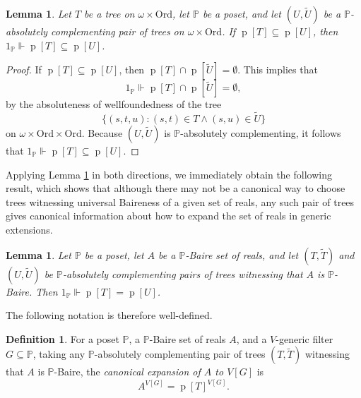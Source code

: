 \documentclass[fleqn, 11pt]{amsart}
\theoremstyle{plain}
\newtheorem{lem}[thm]{Lemma} \newtheorem*{lem*}{Lemma}
\theoremstyle{definition}
\newtheorem{defn}[thm]{Definition} \newtheorem*{defn*}{Definition}
\theoremstyle{remark}
\newcommand{\Ord}{\mathrm{Ord}}
\newcommand{\forces}{\mathbin{\Vdash}}
\DeclareMathOperator{\p}{p}
\begin{document}

\begin{lem}\label{lem-projection-inclusion}
 Let $T$ be a tree on $\omega \times \Ord$, let $\mathbb{P}$ be a poset, and let $(U, \tilde{U})$ be a $\mathbb{P}$-absolutely complementing pair of trees on $\omega \times \Ord$.
 If $\p[T] \subseteq \p[U]$, then $1_{\mathbb{P}} \forces \p[T] \subseteq \p[U]$.
\end{lem}

\begin{proof}
 If $\p[T] \subseteq \p[U]$, then $\p[T] \cap \p[\tilde{U}] = \emptyset$.
 This implies that \[1_{\mathbb{P}} \forces \p[T] \cap \p[\tilde{U}] = \emptyset,\] by the absoluteness of wellfoundedness of the tree \[\{(s,t,u) : (s,t) \in T \wedge (s,u) \in \tilde{U}\}\] on $\omega \times \Ord \times \Ord$.
 Because 
$(U, \tilde{U})$ is $\mathbb{P}$-absolutely complementing, it follows that 
$1_{\mathbb{P}} \forces \p[T] \subseteq \p[U]$.
\end{proof}

Applying Lemma \ref{lem-projection-inclusion} in both directions, we immediately obtain the following result, which shows that although there may not be a canonical way to choose trees witnessing universal Baireness of a given set of reals, any such pair of trees gives canonical information about how to expand the set of reals in generic extensions.

\begin{lem}\label{lem-unique-expansion}
 Let $\mathbb{P}$ be a poset, let $A$ be a $\mathbb{P}$-Baire set of reals, and let $(T,\tilde{T})$ and $(U, \tilde{U})$ be $\mathbb{P}$-absolutely complementing pairs of trees witnessing that $A$ is $\mathbb{P}$-Baire.
 Then $1_{\mathbb{P}} \forces \p[T] = \p[U]$.
\end{lem}

The following notation is therefore well-defined.

\begin{defn}
 For a poset $\mathbb{P}$, a $\mathbb{P}$-Baire set of reals $A$, and a $V$-generic filter $G \subseteq \mathbb{P}$,
 taking any $\mathbb{P}$-absolutely complementing pair of trees $(T,\tilde{T})$ witnessing that $A$ is $\mathbb{P}$-Baire,
 the \emph{canonical expansion of $A$ to $V[G]$} is 
 \[A^{V[G]} = \p[T]^{V[G]}.\]
\end{defn}
\end{document}
